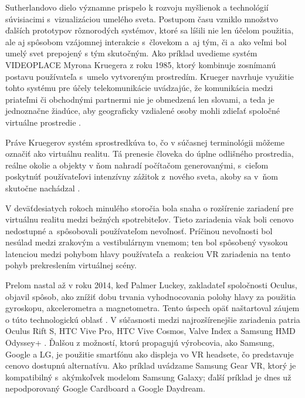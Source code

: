 Sutherlandovo dielo významne prispelo k rozvoju myšlienok a technológií súvisiacimi s~vizualizáciou umelého sveta. Postupom času vzniklo množstvo ďalších 
prototypov rôznorodých systémov, ktoré sa líšili nie len účelom použitia, ale aj spôsobom vzájomnej interakcie s~človekom a~aj tým, či a~ako veľmi bol umelý 
svet prepojený s tým skutočným. Ako príklad uvedieme systém VIDEOPLACE Myrona Kruegera z roku 1985, ktorý kombinuje zosnímanú postavu používateľa s~umelo vytvoreným 
prostredím. Krueger navrhuje využitie tohto systému pre účely telekomunikácie uvádzajúc, že komunikácia medzi priateľmi či obchodnými partnermi nie je 
obmedzená len slovami, a teda je jednoznačne žiadúce, aby geograficky vzdialené osoby mohli zdieľať spoločné virtuálne prostredie 
\cite{kruegerVIDEOPLACEArtificialReality1985}.

Práve Kruegerov systém sprostredkúva to, čo v súčasnej terminológii môžeme označiť ako virtuálnu realitu. Tá prenesie človeka do úplne odlišného prostredia, 
reálne okolie a objekty v ňom nahradí počítačom generovanými, s~cieľom poskytnúť používateľovi intenzívny zážitok z~nového sveta, akoby sa v~ňom skutočne nachádzal
\cite{brighamRealityCheckBasics2017}. 

V deväťdesiatych rokoch minulého storočia bola snaha o rozšírenie zariadení pre virtuálnu realitu medzi bežných spotrebiteľov. Tieto zariadenia však boli cenovo
nedostupné a~spôsobovali používateľom nevoľnosť. Príčinou nevoľnosti bol nesúlad medzi zrakovým a vestibulárnym vnemom; ten bol spôsobený vysokou latenciou medzi pohybom 
hlavy používateľa a~reakciou VR zariadenia na tento pohyb prekreslením virtuálnej scény. 

Prelom nastal až v roku 2014, keď Palmer Luckey, 
zakladateľ spoločnosti Oculus, objavil spôsob, ako znížiť dobu trvania vyhodnocovania polohy hlavy za použitia gyroskopu, akcelerometra a magnetometra. 
Tento úspech opäť naštartoval záujem o túto technologickú oblasť \cite{brighamRealityCheckBasics2017}. V súčasnosti medzi najrozšírenejšie zariadenia patria Oculus Rift S,
HTC Vive Pro, HTC Vive Cosmos, Valve Index a Samsung HMD Odyssey+ \cite{angelovModernVirtualReality2020}. Ďalšou z možností, ktorú propagujú výrobcovia, ako Samsung, Google
a LG, je použitie smartfónu ako displeja vo VR headsete, čo predstavuje cenovo dostupnú alternatívu. Ako príklad uvádzame Samsung Gear VR, ktorý je kompatibilný
s~akýmkoľvek modelom Samsung Galaxy; ďalší príklad je dnes už nepodporovaný Google Cardboard a Google Daydream. 

